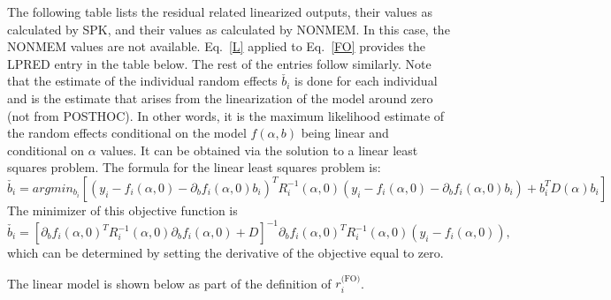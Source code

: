 \documentclass{article}
\begin{document}
The following table lists the residual related linearized outputs, their
values as calculated by SPK, and their values as calculated by NONMEM.
In this case, the NONMEM values are not available. 
Eq.~\ref{L} applied to Eq.~\ref{FO} provides the LPRED entry in the table
below. The rest of the entries follow similarly.
Note that the estimate of the individual random
effects $\check{b_i}$ is done for each individual and is the estimate
that arises from the linearization of the model around zero (not from
POSTHOC). In other words, it is the maximum likelihood estimate of the
random effects conditional on the model $f(\alpha,b)$ being linear and
conditional on $\alpha$ values. It 
can be obtained via the solution to a linear least squares problem. 
The formula for the linear least squares problem is:
  \begin{equation}
   \check{b_i} = arg min_{b_i} \left[ \left( y_i - f_i(\alpha, 0) -
	\partial_b f_i(\alpha, 0) b_i \right)^T R_i^{-1}(\alpha, 0)
	\left( y_i - f_i(\alpha, 0) -
	\partial_b f_i(\alpha, 0) b_i \right) + b_i^TD(\alpha)b_i \right]
  \end{equation}
The minimizer of this objective function is
  \begin{equation}
   \check{b_i} = \left[ \partial_b f_i(\alpha, 0)^T R_i^{-1}(\alpha, 0) \partial_b f_i(\alpha, 0) + D \right]^{-1}
        \partial_b f_i(\alpha, 0)^T R_i^{-1}(\alpha, 0)
        \left( y_i - f_i(\alpha, 0) \right)  ,
  \end{equation}
which can be determined by setting the derivative of the 
objective equal to zero.

The linear model is shown below as part of 
the definition of $r^{\mbox{(FO)}}_i$.
\end{document}
